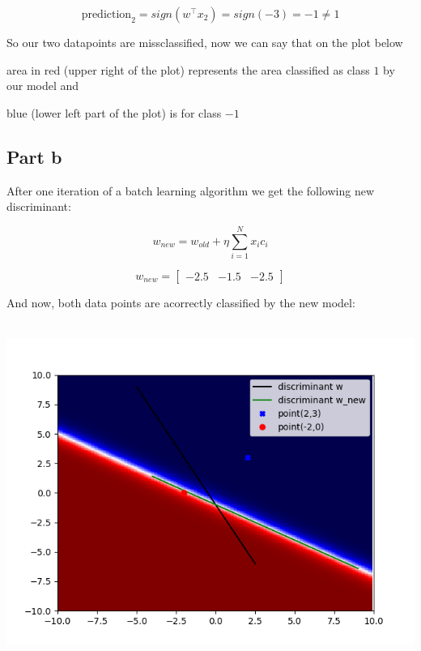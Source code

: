 \documentclass[a4paper, 10pt]{article}
\begin{document}
$$ 

\text{prediction}_2 = sign(w^\top x_2) = sign(-3) = -1 \ne 1 

$$ 

So our two datapoints are missclassified, now we can say that on the plot below 

area in red (upper right of the plot) represents the area classified as class $1$ by our model and 

blue (lower left part of the plot) is for class $-1$ 



\subsection{Part b} 

After one iteration of a batch learning algorithm we get the following new discriminant: 

$$ 

w_{new} = w_{old} + \eta\sum_{i=1}^N x_ic_i 

$$ 

$$ 

w_{new} = \begin{bmatrix}-2.5 & -1.5 & -2.5\end{bmatrix} 

$$ 

And now, both data points are acorrectly classified by the new model: 

\\ 

\includegraphics[scale=0.6]{ex1_b.png} 
\end{document}
